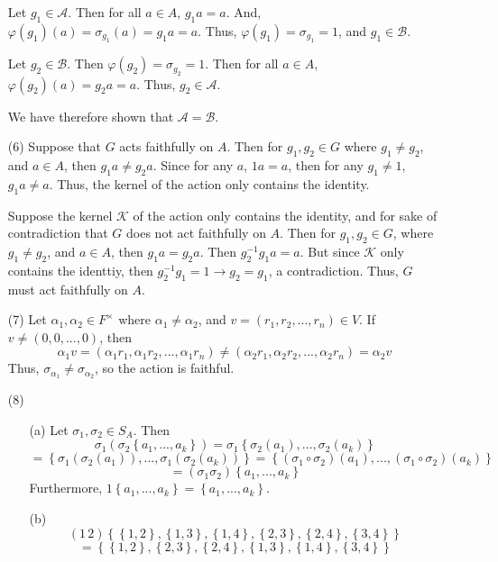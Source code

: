 \documentclass[12pt]{article}
\begin{document}
\begin{itemize}
Let $g_1 \in \mathcal{A}$. Then for all $a \in A$, $g_1a = a$. And, $\varphi(g_1)(a) = \sigma_{g_1}(a) = g_1a = a$. Thus, $\varphi(g_1) = \sigma_{g_1} = 1$, and $g_1 \in \mathcal{B}$.

Let $g_2 \in \mathcal{B}$. Then $\varphi(g_2) = \sigma_{g_2} = 1$. Then for all $a \in A$, $\varphi(g_2)(a) = g_2a = a$. Thus, $g_2 \in \mathcal{A}$.

We have therefore shown that $\mathcal{A} = \mathcal{B}$.
\item[(6)]
Suppose that $G$ acts faithfully on $A$. Then for $g_1, g_2 \in G$ where $g_1 \neq g_2$, and $a \in A$, then $g_1a \neq g_2a$. Since for any $a$, $1a = a$, then for any $g_1 \neq 1$, $g_1a \neq a$. Thus, the kernel of the action only contains the identity.

Suppose the kernel $\mathcal{K}$ of the action only contains the identity, and for sake of contradiction that $G$ does not act faithfully on $A$. Then for $g_1, g_2 \in G$, where $g_1 \neq g_2$, and $a \in A$, then $g_1a = g_2a$. Then $g_2^{-1}g_1a = a$. But since $\mathcal{K}$ only contains the identtiy, then $g_2^{-1}g_1 = 1 \rightarrow g_2 = g_1$, a contradiction. Thus, $G$ must act faithfully on $A$.
\item[(7)]
Let $\alpha_1, \alpha_2 \in F^\times$ where $\alpha_1 \neq \alpha_2$, and $v = (r_1, r_2, ..., r_n) \in V$. If $v \neq (0, 0, ..., 0)$, then
$$\alpha_1v = (\alpha_1r_1, \alpha_1r_2, ..., \alpha_1r_n) \neq (\alpha_2r_1, \alpha_2r_2, ..., \alpha_2r_n) = \alpha_2v$$
Thus, $\sigma_{\alpha_1} \neq \sigma_{\alpha_2}$, so the action is faithful.
\item[(8)]
\begin{itemize}
\item[(a)]
Let $\sigma_1, \sigma_2 \in S_A$. Then
$$\sigma_1(\sigma_2\left\lbrace a_1, ..., a_k\right\rbrace) = \sigma_1\left\lbrace \sigma_2(a_1), ..., \sigma_2(a_k)\right\rbrace$$
$$= \left\lbrace \sigma_1(\sigma_2(a_1)), ..., \sigma_1(\sigma_2(a_k))\right\rbrace = \left\lbrace (\sigma_1 \circ \sigma_2)(a_1), ..., (\sigma_1 \circ \sigma_2)(a_k) \right\rbrace$$
$$= (\sigma_1\sigma_2)\left\lbrace a_1, ..., a_k\right\rbrace$$
Furthermore, $1\left\lbrace a_1, ..., a_k\right\rbrace = \left\lbrace a_1, ..., a_k\right\rbrace$.
\item[(b)]
$$(1 \, 2)\left\lbrace \left\lbrace 1, 2 \right\rbrace, \left\lbrace 1, 3 \right\rbrace, \left\lbrace 1, 4 \right\rbrace, \left\lbrace 2, 3 \right\rbrace, \left\lbrace 2, 4 \right\rbrace, \left\lbrace 3, 4 \right\rbrace \right\rbrace$$
$$= \left\lbrace \left\lbrace 1, 2 \right\rbrace, \left\lbrace 2, 3 \right\rbrace, \left\lbrace 2, 4 \right\rbrace, \left\lbrace 1, 3 \right\rbrace, \left\lbrace 1, 4 \right\rbrace, \left\lbrace 3, 4 \right\rbrace \right\rbrace$$

\end{itemize}
\end{itemize}
\end{document}

